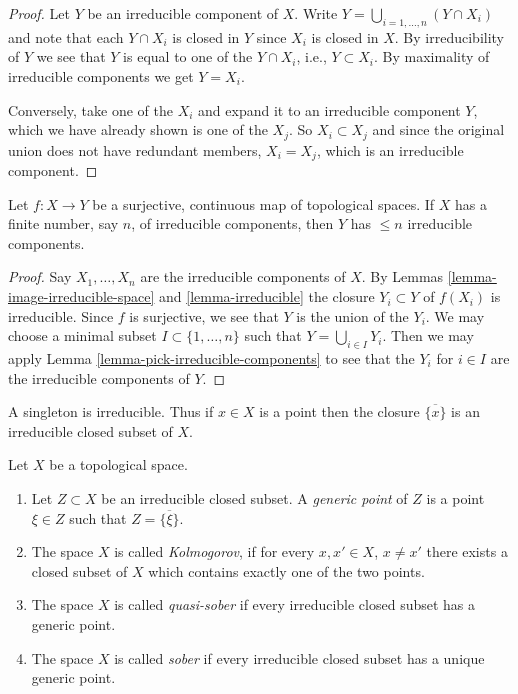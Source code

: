 \begin{proof}
Let $Y$ be an irreducible component of $X$. Write
$Y = \bigcup_{i = 1, \ldots, n} (Y \cap X_i)$
and note that each $Y \cap X_i$ is closed in $Y$ since $X_i$ is closed in $X$.
By irreducibility of $Y$ we see that $Y$ is equal to one of the $Y \cap X_i$,
i.e., $Y \subset X_i$.  By maximality of irreducible components we
get $Y = X_i$.

\medskip\noindent
Conversely, take one of the $X_i$ and expand it to an irreducible component
$Y$, which we have already shown is one of the $X_j$.
So $X_i \subset X_j$ and since the original union does not have
redundant members, $X_i = X_j$, which is an irreducible component.
\end{proof}

\begin{lemma}
\label{lemma-surjective-continuous-irreducible-components}
Let $f : X \to Y$ be a surjective, continuous map of topological spaces.
If $X$ has a finite number, say $n$, of irreducible components, then
$Y$ has $\leq n$ irreducible components.
\end{lemma}

\begin{proof}
Say $X_1, \ldots, X_n$ are the irreducible components of $X$.
By Lemmas \ref{lemma-image-irreducible-space} and \ref{lemma-irreducible}
the closure $Y_i \subset Y$ of $f(X_i)$ is irreducible.
Since $f$ is surjective, we see that $Y$ is the union of the $Y_i$.
We may choose a minimal subset $I \subset \{1, \ldots, n\}$
such that $Y = \bigcup_{i \in I} Y_i$. Then we may apply
Lemma \ref{lemma-pick-irreducible-components} to see that the $Y_i$
for $i \in I$ are the irreducible components of $Y$.
\end{proof}

\noindent
A singleton is irreducible. Thus if $x \in X$ is a point
then the closure $\overline{\{x\}}$ is an irreducible closed
subset of $X$.

\begin{definition}
\label{definition-generic-point}
Let $X$ be a topological space.
\begin{enumerate}
\item Let $Z \subset X$ be an irreducible closed subset.
A {\it generic point} of $Z$ is a point $\xi \in Z$ such
that $Z = \overline{\{\xi\}}$.
\item The space $X$ is called {\it Kolmogorov}, if for every $x, x' \in X$,
$x \not = x'$ there exists a closed subset of $X$ which contains
exactly one of the two points.
\item The space $X$ is called {\it quasi-sober} if every
irreducible closed subset has a generic point.
\item The space $X$ is called {\it sober} if every
irreducible closed subset has a unique generic point.
\end{enumerate}
\end{definition}

